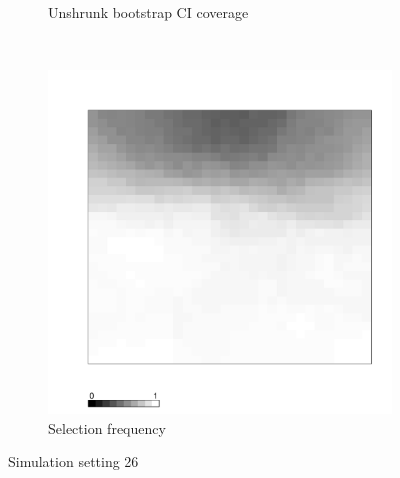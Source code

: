 \documentclass[authoryear, review, 11pt]{elsarticle}
\begin{document}
\begin{figure}
\begin{subfigure}[b]{0.45\textwidth}
		\caption{Unshrunk bootstrap CI coverage}
	\end{subfigure}%
	~ %
	\begin{subfigure}[b]{0.45\textwidth}
	\centering
		\includegraphics[width=\textwidth]{../../figures/simulation/X1.15.26.selection.pdf}
		\caption{Selection frequency}
	\end{subfigure}
	\caption{Simulation setting 26}
\end{figure}

\clearpage
\end{document}
